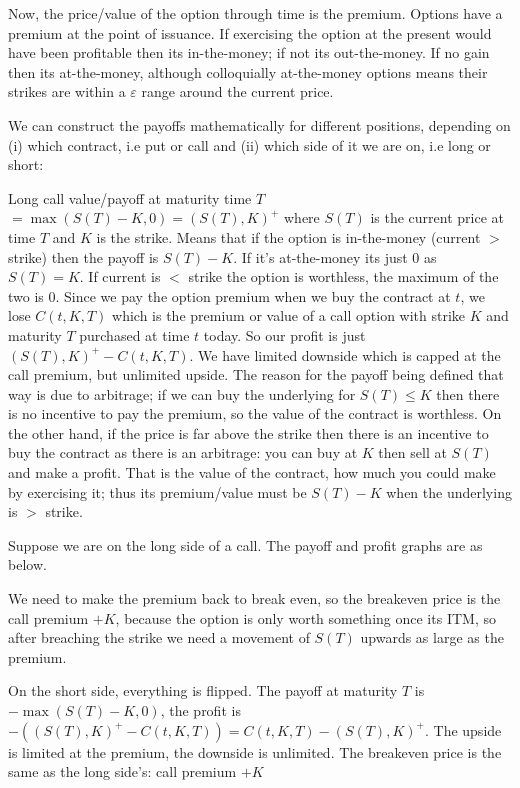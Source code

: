 \documentclass[9pt]{extarticle}
\begin{document}
Now, the price/value of the 
option through time is the premium. Options have 
a premium at the point of issuance. If exercising 
the option at the present would have been profitable
then its in-the-money; if not its out-the-money. 
If no gain then its at-the-money, although colloquially 
at-the-money options means their strikes are within a $\varepsilon$ range around 
the current price.

We can construct the payoffs mathematically for different positions, depending 
on (i) which contract, i.e put or call and (ii) which side of it we are on, i.e 
long or short:

Long call value/payoff at maturity time $T$ $= \operatorname{max}(S(T)-K,0)=(S(T),K)^+$ where
$S(T)$ is the current price at time $T$ and $K$ is the strike. Means that 
if the option is in-the-money (current $>$ strike) then the payoff is 
$S(T)-K$. If it's at-the-money its just $0$ as $S(T)=K$. If 
current is $<$ strike the option is worthless, the maximum of the two 
is $0$. Since we pay the option premium when we buy the contract at $t$, we lose 
$C(t,K,T)$ which is the premium or value of a call option with strike 
$K$ and maturity $T$ purchased 
at time $t$ today. 
So our profit is just $(S(T),K)^+ - C(t,K,T)$. We have limited downside which is capped 
at the call premium, but unlimited upside. The reason for the payoff being 
defined that way is due to arbitrage; if we can buy the underlying for $S(T)\leq K$ 
then there is no incentive to pay the premium, so the value of the contract is worthless. 
On the other hand, if the price is far above the strike then there is an incentive to 
buy the contract as there is an arbitrage: you can buy at $K$ then sell at 
$S(T)$ and make a profit. That is the value of the contract, how much you could make 
by exercising it; thus its premium/value 
must be $S(T)-K$ when the underlying is $>$ strike.

Suppose we are on the long side of a call. The payoff and profit 
graphs are as below. 

We need to make the premium back to break even, so the breakeven price 
is the call premium $+ K$, because the option is only worth something 
once its ITM, so after breaching the strike we need a movement of $S(T)$ upwards 
as large as the premium.


On the short side, everything is flipped. The payoff at maturity $T$ is 
$-\operatorname{max}(S(T)-K,0)$, the profit is  $-((S(T),K)^+ - C(t,K,T))= 
 C(t,K,T) -  (S(T),K)^+ $. The upside is limited at the premium, the downside is 
unlimited. The breakeven price is the same as the long side's: call premium $+ K$
\end{document}
